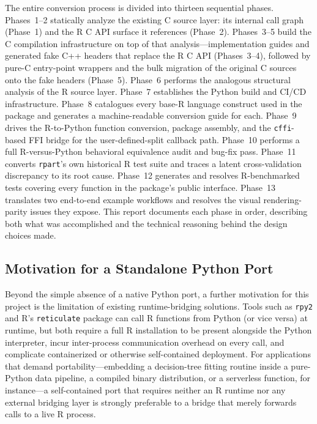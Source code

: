 \documentclass[12pt]{article}
\begin{document}
The entire conversion process is divided into thirteen sequential phases. Phases~1--2 statically analyze the existing C source layer: its internal call graph (Phase~1) and the R C API surface it references (Phase~2). Phases~3--5 build the C compilation infrastructure on top of that analysis---implementation guides and generated fake C++ headers that replace the R C API (Phases~3--4), followed by pure-C entry-point wrappers and the bulk migration of the original C sources onto the fake headers (Phase~5). Phase~6 performs the analogous structural analysis of the R source layer. Phase~7 establishes the Python build and CI/CD infrastructure. Phase~8 catalogues every base-R language construct used in the package and generates a machine-readable conversion guide for each. Phase~9 drives the R-to-Python function conversion, package assembly, and the \texttt{cffi}-based FFI bridge for the user-defined-split callback path. Phase~10 performs a full R-versus-Python behavioral equivalence audit and bug-fix pass. Phase~11 converts \texttt{rpart}'s own historical R test suite and traces a latent cross-validation discrepancy to its root cause. Phase~12 generates and resolves R-benchmarked tests covering every function in the package's public interface. Phase~13 translates two end-to-end example workflows and resolves the visual rendering-parity issues they expose. This report documents each phase in order, describing both what was accomplished and the technical reasoning behind the design choices made.

\subsection{Motivation for a Standalone Python Port}
\label{sec:intro:motivation}

Beyond the simple absence of a native Python port, a further motivation for this project is the limitation of existing runtime-bridging solutions. Tools such as \texttt{rpy2} and R's \texttt{reticulate} package can call R functions from Python (or vice versa) at runtime, but both require a full R installation to be present alongside the Python interpreter, incur inter-process communication overhead on every call, and complicate containerized or otherwise self-contained deployment. For applications that demand portability---embedding a decision-tree fitting routine inside a pure-Python data pipeline, a compiled binary distribution, or a serverless function, for instance---a self-contained port that requires neither an R runtime nor any external bridging layer is strongly preferable to a bridge that merely forwards calls to a live R process.
\end{document}
